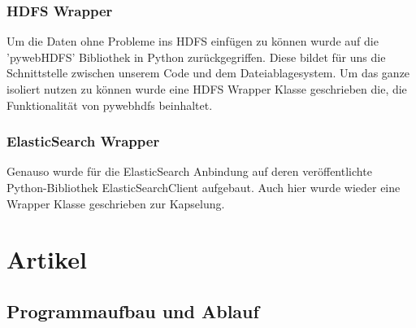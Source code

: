 \documentclass[12pt,oneside,a4paper,parskip]{scrbook}
\begin{document}
\subsubsection{HDFS Wrapper}

Um die Daten ohne Probleme ins HDFS einfügen zu können wurde auf die 'pywebHDFS' Bibliothek in Python zurückgegriffen. Diese bildet für uns die Schnittstelle zwischen unserem Code und dem Dateiablagesystem. Um das ganze isoliert nutzen zu können wurde eine HDFS Wrapper Klasse geschrieben die, die Funktionalität von pywebhdfs beinhaltet.

\subsubsection{ElasticSearch Wrapper}

Genauso wurde für die ElasticSearch Anbindung auf deren veröffentlichte Python-Bibliothek ElasticSearchClient aufgebaut. Auch hier wurde wieder eine Wrapper Klasse geschrieben zur Kapselung.
\pagebreak


\section{Artikel}


\subsection{Programmaufbau und Ablauf}
\end{document}
